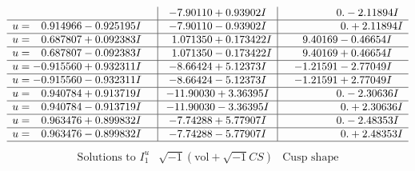 \documentclass[1p]{elsarticle_modified}
\theoremstyle{definition}
\newcommand{\I}{\sqrt{-1}}
\begin{document}
$$\begin{array}{c|c|c}
 & -7.90110 + 0.93902 I & \phantom{-0.000000 } 0. - 2.11894 I \\ \hline\begin{aligned}
u &= \phantom{-}0.914966 - 0.925195 I\end{aligned}
 & -7.90110 - 0.93902 I & \phantom{-0.000000 -}0. + 2.11894 I \\ \hline\begin{aligned}
u &= \phantom{-}0.687807 + 0.092383 I\end{aligned}
 & \phantom{-}1.071350 + 0.173422 I & \phantom{-}9.40169 - 0.46654 I \\ \hline\begin{aligned}
u &= \phantom{-}0.687807 - 0.092383 I\end{aligned}
 & \phantom{-}1.071350 - 0.173422 I & \phantom{-}9.40169 + 0.46654 I \\ \hline\begin{aligned}
u &= -0.915560 + 0.932311 I\end{aligned}
 & -8.66424 + 5.12373 I & -1.21591 - 2.77049 I \\ \hline\begin{aligned}
u &= -0.915560 - 0.932311 I\end{aligned}
 & -8.66424 - 5.12373 I & -1.21591 + 2.77049 I \\ \hline\begin{aligned}
u &= \phantom{-}0.940784 + 0.913719 I\end{aligned}
 & -11.90030 + 3.36395 I & \phantom{-0.000000 } 0. - 2.30636 I \\ \hline\begin{aligned}
u &= \phantom{-}0.940784 - 0.913719 I\end{aligned}
 & -11.90030 - 3.36395 I & \phantom{-0.000000 -}0. + 2.30636 I \\ \hline\begin{aligned}
u &= \phantom{-}0.963476 + 0.899832 I\end{aligned}
 & -7.74288 + 5.77907 I & \phantom{-0.000000 } 0. - 2.48353 I \\ \hline\begin{aligned}
u &= \phantom{-}0.963476 - 0.899832 I\end{aligned}
 & -7.74288 - 5.77907 I & \phantom{-0.000000 -}0. + 2.48353 I\\
 \hline 
 \end{array}$$\newpage$$\begin{array}{c|c|c}  
\text{Solutions to }I^u_{1}& \I (\text{vol} + \sqrt{-1}CS) & \text{Cusp shape}\\

\end{array}$$
\end{document}
